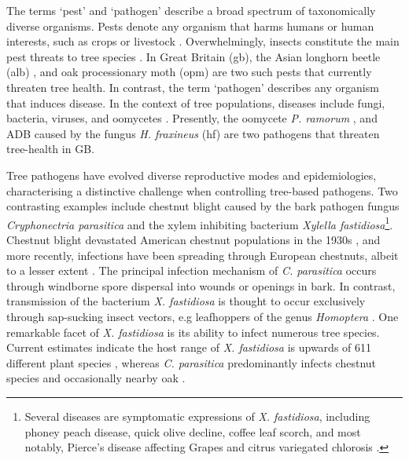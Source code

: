 The terms `pest' and `pathogen' describe a broad spectrum of taxonomically diverse organisms. Pests denote any organism that harms humans or human interests, such as crops or livestock \cite{buckle2015rodent, oerke2006crop, de1964biological}. Overwhelmingly, insects constitute the main
pest threats to tree species \cite{metcalf1994introduction}. In Great Britain (\acrshort{gb}), the Asian longhorn beetle (\acrshort{alb}) \cite{haack2010managing}, and oak processionary moth (\acrshort{opm}) \cite{tomlinson2015managing} are two such pests that currently threaten tree health.
In contrast, the term `pathogen' describes any organism that induces disease. In the context of tree populations, diseases include fungi, bacteria, viruses, and oomycetes \cite{balloux2017q, Boyd1235773}. Presently, the oomycete \textit{P. ramorum} \cite{brasier2005phytophthora}, and ADB
caused by the fungus \textit{H. fraxineus} (\acrshort{hf}) \cite{ash-dieback-costs, mitchell2014ash} are two pathogens that threaten tree-health in GB.

Tree pathogens have evolved diverse reproductive modes and epidemiologies,  characterising a distinctive challenge when controlling tree-based pathogens. Two contrasting examples include chestnut blight caused by the bark pathogen fungus \textit{ Cryphonectria parasitica} and the xylem inhibiting bacterium \textit{Xylella fastidiosa}\footnote{Several diseases are symptomatic expressions of \textit{X. fastidiosa}, including phoney peach disease, quick olive decline, coffee leaf scorch, and most notably, Pierce's disease affecting Grapes and citrus variegated chlorosis \cite{hopkins2002xylella}.}. 
Chestnut blight devastated American chestnut populations in the 1930s \cite{doi:10.1002/9780470535486.ch7}, and more recently, infections have been spreading through European chestnuts, albeit to a lesser extent \cite{heiniger1994biological}.
The principal infection mechanism of \textit{ C. parasitica} occurs through windborne spore dispersal into wounds or openings in bark. 
In contrast, transmission of the bacterium \textit{X. fastidiosa} is thought to occur exclusively through sap-sucking insect vectors, e.g leafhoppers of the genus \textit{Homoptera} \cite{redak2004biology}. 
One remarkable facet of \textit{X. fastidiosa} is its ability to infect numerous tree species. Current estimates indicate the host range of \textit{X. fastidiosa} is upwards of 611 different plant species \cite{european2022update}, whereas \textit{C. parasitica} predominantly infects chestnut species and occasionally nearby oak \cite{rigling2018cryphonectria}. 

